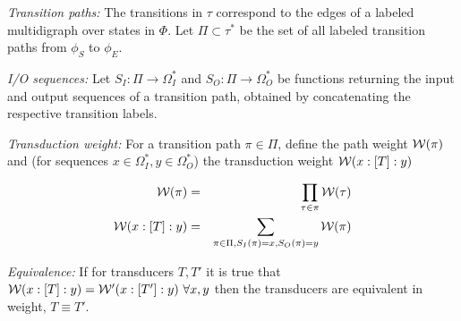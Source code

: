 \documentclass{article}
\newcommand\wtrans[4]{#1(#2 : [#3] : #4)}
\newcommand\transequiv{\equiv}
\newcommand\States{\Phi}
\newcommand\Transitions{\tau}
\newcommand\startstate{\phi_S}
\newcommand\laststate{\phi_E}
\newcommand\weight{{\cal W}}
\begin{document}
{\em Transition paths:}
The transitions in $\Transitions$ correspond to the edges of a labeled multidigraph over states in $\States$.
Let $\Pi \subset \Transitions^\ast$ be the set of all labeled transition paths from $\startstate$ to $\laststate$.

{\em I/O sequences:}
Let
$S_I:\Pi \to \Omega_I^\ast$ and
$S_O:\Pi \to \Omega_O^\ast$
be functions returning the input and output sequences of a transition path,
obtained by concatenating the respective transition labels.

{\em Transduction weight:}
For a transition path $\pi \in \Pi$,
define the path weight $\weight(\pi)$ and
(for sequences $x \in \Omega_I^\ast, y \in \Omega_O^\ast$)
the transduction weight $\wtrans{\weight}{x}{T}{y}$

\begin{eqnarray*}
\weight(\pi) & = & \prod_{\Transitions \in \pi} \weight(\Transitions) \\
\wtrans{\weight}{x}{T}{y} & = & \sum_{\pi \in \Pi, S_I(\pi)=x, S_O(\pi)=y} \weight(\pi)
\end{eqnarray*}

{\em Equivalence:}
If for transducers $T,T'$ it is true that $\wtrans{\weight}{x}{T}{y}=\wtrans{\weight'}{x}{T'}{y}\ \forall x,y$ then the transducers are equivalent in weight, $T \transequiv T'$.
\end{document}
